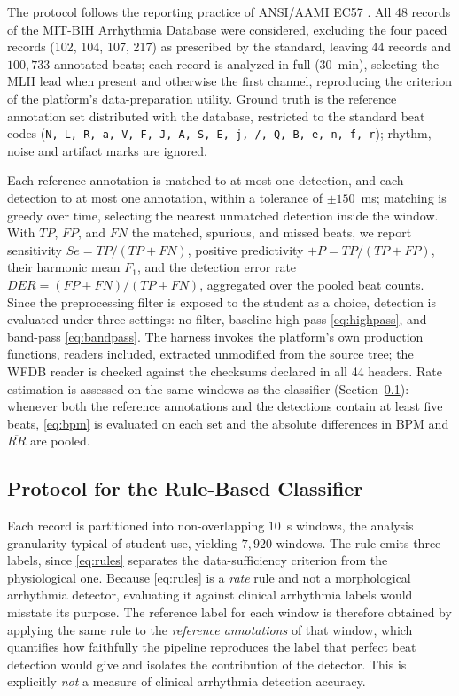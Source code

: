 \documentclass[conference]{IEEEtran}
\begin{document}
The protocol follows the reporting practice of ANSI/AAMI EC57 \cite{aami-ec57}. All 48 records of the MIT-BIH Arrhythmia Database were considered, excluding the four paced records (102, 104, 107, 217) as prescribed by the standard, leaving 44 records and $100{,}733$ annotated beats; each record is analyzed in full ($30$~min), selecting the MLII lead when present and otherwise the first channel, reproducing the criterion of the platform's data-preparation utility. Ground truth is the reference annotation set distributed with the database, restricted to the standard beat codes (\texttt{N, L, R, a, V, F, J, A, S, E, j, /, Q, B, e, n, f, r}); rhythm, noise and artifact marks are ignored.

Each reference annotation is matched to at most one detection, and each detection to at most one annotation, within a tolerance of $\pm150$~ms; matching is greedy over time, selecting the nearest unmatched detection inside the window. With $TP$, $FP$, and $FN$ the matched, spurious, and missed beats, we report sensitivity $Se=TP/(TP+FN)$, positive predictivity $+P=TP/(TP+FP)$, their harmonic mean $F_1$, and the detection error rate $DER=(FP+FN)/(TP+FN)$, aggregated over the pooled beat counts. Since the preprocessing filter is exposed to the student as a choice, detection is evaluated under three settings: no filter, baseline high-pass \eqref{eq:highpass}, and band-pass \eqref{eq:bandpass}. The harness invokes the platform's own production functions, readers included, extracted unmodified from the source tree; the WFDB reader is checked against the checksums declared in all 44 headers. Rate estimation is assessed on the same windows as the classifier (Section~\ref{sec:protocol-classifier}): whenever both the reference annotations and the detections contain at least five beats, \eqref{eq:bpm} is evaluated on each set and the absolute differences in BPM and $\overline{RR}$ are pooled.

\subsection{Protocol for the Rule-Based Classifier}
\label{sec:protocol-classifier}

Each record is partitioned into non-overlapping $10$~s windows, the analysis granularity typical of student use, yielding $7{,}920$ windows. The rule emits three labels, since \eqref{eq:rules} separates the data-sufficiency criterion from the physiological one. Because \eqref{eq:rules} is a \emph{rate} rule and not a morphological arrhythmia detector, evaluating it against clinical arrhythmia labels would misstate its purpose. The reference label for each window is therefore obtained by applying the same rule to the \emph{reference annotations} of that window, which quantifies how faithfully the pipeline reproduces the label that perfect beat detection would give and isolates the contribution of the detector. This is explicitly \emph{not} a measure of clinical arrhythmia detection accuracy.
\end{document}
